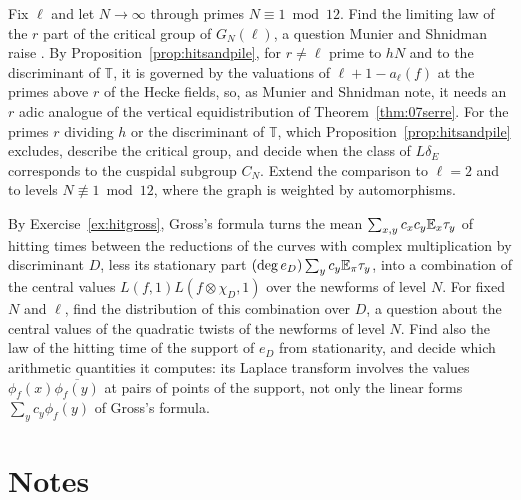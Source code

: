 \begin{problem}\label{op:hitsandpile}
Fix $\ell$ and let $N\to\infty$ through primes $N\equiv1\bmod12$. Find the limiting law of the $r$ part of the critical group of $G_N(\ell)$, a question Munier and Shnidman raise \cite{muniershnidman2023}. By Proposition~\ref{prop:hitsandpile}, for $r\ne\ell$ prime to $hN$ and to the discriminant of $\mathbb T$, it is governed by the valuations of $\ell+1-a_\ell(f)$ at the primes above $r$ of the Hecke fields, so, as Munier and Shnidman note, it needs an $r$ adic analogue of the vertical equidistribution of Theorem~\ref{thm:07serre}. For the primes $r$ dividing $h$ or the discriminant of $\mathbb T$, which Proposition~\ref{prop:hitsandpile} excludes, describe the critical group, and decide when the class of $L\delta_E$ corresponds to the cuspidal subgroup $C_N$. Extend the comparison to $\ell=2$ and to levels $N\not\equiv1\bmod12$, where the graph is weighted by automorphisms.
\end{problem}

\begin{problem}\label{op:hitgross}
By Exercise~\ref{ex:hitgross}, Gross's formula turns the mean $\sum_{x,y}c_xc_y\mathbb{E}_x\tau_y$ of hitting times between the reductions of the curves with complex multiplication by discriminant $D$, less its stationary part $(\deg e_D)\sum_yc_y\mathbb{E}_\pi\tau_y$, into a combination of the central values $L(f,1)L(f\otimes\chi_D,1)$ over the newforms of level $N$. For fixed $N$ and $\ell$, find the distribution of this combination over $D$, a question about the central values of the quadratic twists of the newforms of level $N$. Find also the law of the hitting time of the support of $e_D$ from stationarity, and decide which arithmetic quantities it computes: its Laplace transform involves the values $\phi_f(x)\overline{\phi_f(y)}$ at pairs of points of the support, not only the linear forms $\sum_yc_y\phi_f(y)$ of Gross's formula.
\end{problem}

\section{Notes}

